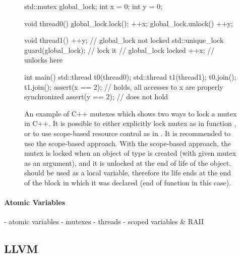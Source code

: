 \begin{figure}[tp]
    \begin{cppcode}
        std::mutex global_lock;
        int x = 0;
        int y = 0;

        void thread0() {
            global_lock.lock();
            ++x;
            global_lock.unlock()
            ++y;
        }

        void thread1() {
            ++y; // global_lock not locked
            std::unique_lock guard(global_lock); // lock it
            // global_lock locked
            ++x;
        } // unlocks here

        int main() {
            std::thread t0(thread0);
            std::thread t1(thread1);
            t0.join(); t1.join();
            assert(x == 2); // holds, all accesses to x are properly synchronized
            assert(y == 2); // does not hold
        }
    \end{cppcode}
    \caption{An example of C++ mutexes which shows two ways to lock a mutex in
    C++.
    It is possible to either explicitly lock mutex as in function
    , or to use scope-based resource control as in
    .
    It is recommended to use the scope-based approach.
    With the scope-based approach, the mutex is locked when an object of type
     is created (with given mutex as an argument),
    and it is unlocked at the end of life of the  object.
     should be used as a local variable, therefore its
    life ends at the end of the block in which it was declared (end of function
     in this case).
    }\label{fig:prelim:cppmtx}
\end{figure}




\paragraph{Atomic Variables}

- atomic variables
- mutexes
- threads
- scoped variables \& RAII

\subsection{LLVM}

